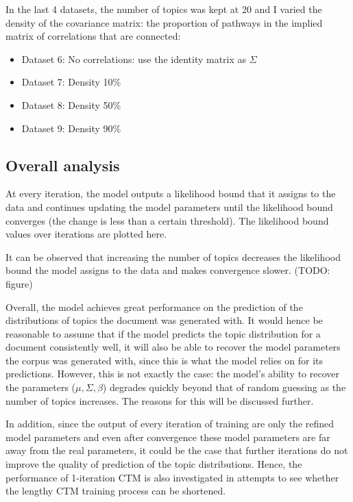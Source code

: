 \documentclass[12pt,a4paper,twoside,openright]{report}
\begin{document}
In the last 4 datasets, the number of topics was kept at 20 and I varied the density of the covariance matrix: the proportion of pathways in the implied matrix of correlations that are connected:

\begin{itemize}[noitemsep]
\item Dataset 6: No correlations: use the identity matrix as $\Sigma$
\item Dataset 7: Density 10\%
\item Dataset 8: Density 50\%
\item Dataset 9: Density 90\%
\end{itemize}

\subsection{Overall analysis}

At every iteration, the model outputs a likelihood bound that it assigns to the data and continues updating the model parameters until the likelihood bound converges (the change is less than a certain threshold). The likelihood bound values over iterations are plotted here.

It can be observed that increasing the number of topics decreases the likelihood bound the model assigns to the data and makes convergence slower. (TODO: figure)

Overall, the model achieves great performance on the prediction of the distributions of topics the document was generated with. It would hence be reasonable to assume that if the model predicts the topic distribution for a document consistently well, it will also be able to recover the model parameters the corpus was generated with, since this is what the model relies on for its predictions. However, this is not exactly the case: the model's ability to recover the parameters ($\mu, \Sigma, \beta$) degrades quickly beyond that of random guessing as the number of topics increases. The reasons for this will be discussed further.

In addition, since the output of every iteration of training are only the refined model parameters and even after convergence these model parameters are far away from the real parameters, it could be the case that further iterations do not improve the quality of prediction of the topic distributions. Hence, the performance of 1-iteration CTM is also investigated in attempts to see whether the lengthy CTM training process can be shortened.
\end{document}
